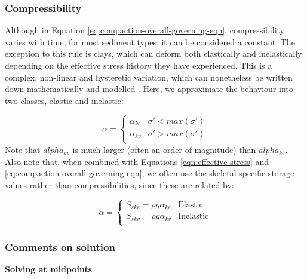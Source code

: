 \documentclass{article}
\begin{document}
\subsubsection{Compressibility}

Although in Equation \ref{eq:compaction-overall-governing-eqn}, compressibility varies with time, for most sediment types, it can be considered a constant. The exception to this rule is clays, which can deform both elastically and inelastically depending on the effective stress history they have experienced. This is a complex, non-linear and hysteretic variation, which can nonetheless be written down mathematically and modelled \cite{helm_one-dimensional_1976}. Here, we approximate the behaviour into two classes, elastic and inelastic:

\begin{equation}
\label{eq:compressibility-clays}
\alpha = 
\begin{cases}
\alpha_{ke} & \sigma' < max(\sigma') \\
\alpha_{kv} & \sigma' > max(\sigma') \\
\end{cases}
\end{equation}
Note that $alpha_{kv}$ is much larger (often an order of magnitude) than $alpha_{ke}$. Also note that, when combined with Equations \ref{eqn:effective-stress} and \ref{eq:compaction-overall-governing-eqn}, we often use the skeletal specific storage values rather than compressibilities, since these are related by:

\begin{equation}
\label{eq:skeletal-specific-storage}
\alpha = 
\begin{cases}
S_{ske} = \rho g \alpha_{ke} & \text{Elastic} \\
S_{skv} = \rho g \alpha_{kv} & \text{Inelastic} \\
\end{cases}
\end{equation}

\subsubsection{Comments on solution}

\textbf{Solving at midpoints}
\end{document}
